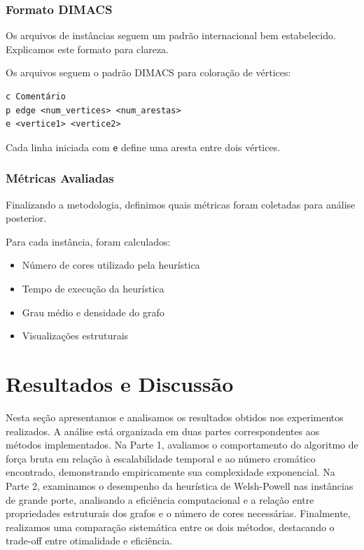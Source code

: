 \documentclass[12pt]{article}
\begin{document}
\subsubsection{Formato DIMACS}

Os arquivos de instâncias seguem um padrão internacional bem estabelecido. Explicamos este formato para clareza.

Os arquivos seguem o padrão DIMACS para coloração de vértices:

\begin{verbatim}
c Comentário
p edge <num_vertices> <num_arestas>
e <vertice1> <vertice2>
\end{verbatim}

Cada linha iniciada com \texttt{e} define uma aresta entre dois vértices.

\subsubsection{Métricas Avaliadas}

Finalizando a metodologia, definimos quais métricas foram coletadas para análise posterior.

Para cada instância, foram calculados:

\begin{itemize}
    \item Número de cores utilizado pela heurística
    \item Tempo de execução da heurística
    \item Grau médio e densidade do grafo
    \item Visualizações estruturais
\end{itemize}

\newpage
\section{Resultados e Discussão}

Nesta seção apresentamos e analisamos os resultados obtidos nos experimentos realizados. A análise está organizada em duas partes correspondentes aos métodos implementados. Na Parte 1, avaliamos o comportamento do algoritmo de força bruta em relação à escalabilidade temporal e ao número cromático encontrado, demonstrando empiricamente sua complexidade exponencial. Na Parte 2, examinamos o desempenho da heurística de Welsh-Powell nas instâncias de grande porte, analisando a eficiência computacional e a relação entre propriedades estruturais dos grafos e o número de cores necessárias. Finalmente, realizamos uma comparação sistemática entre os dois métodos, destacando o trade-off entre otimalidade e eficiência.
\end{document}
